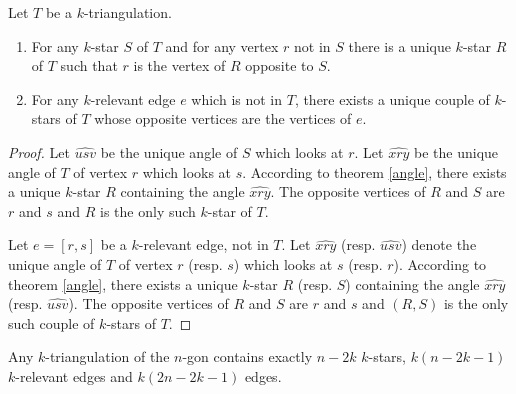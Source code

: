 \documentclass[12pt]{amsart}
\begin{document}

\begin{lemma}\label{findingstars}
Let $T$ be a $k$-triangulation.
\begin{enumerate}
\item For any $k$-star $S$ of $T$ and for any vertex $r$ not in $S$ there is a unique $k$-star $R$ of $T$ such that $r$ is the vertex of $R$ opposite to $S$.
\item For any $k$-relevant edge $e$ which is not in $T$, there exists a unique couple of $k$-stars of $T$ whose opposite vertices are the vertices of $e$.
\end{enumerate}
\end{lemma}

\begin{proof}
Let $\widehat{usv}$ be the unique angle of $S$ which looks at $r$. Let $\widehat{xry}$ be the unique angle of $T$ of vertex $r$ which looks at $s$. According to theorem \ref{angle}, there exists a unique $k$-star $R$ containing the angle $\widehat{xry}$. The opposite vertices of $R$ and $S$ are $r$ and $s$ and $R$ is the only such $k$-star of $T$.

Let $e=[r,s]$ be a $k$-relevant edge, not in $T$. Let $\widehat{xry}$ (resp. $\widehat{usv}$) denote the unique angle of $T$ of vertex $r$ (resp. $s$) which looks at $s$ (resp. $r$). According to theorem \ref{angle}, there exists a unique $k$-star $R$ (resp. $S$) containing the angle $\widehat{xry}$ (resp. $\widehat{usv}$). The opposite vertices of $R$ and $S$ are $r$ and $s$ and $(R,S)$ is the only such couple of $k$-stars of $T$.
\end{proof}

\begin{corollary}\label{starsenumeration}
Any $k$-triangulation of the $n$-gon contains exactly $n-2k$ $k$-stars, $k(n-2k-1)$ $k$-relevant edges and $k(2n-2k-1)$ edges.
\end{corollary}
\end{document}
